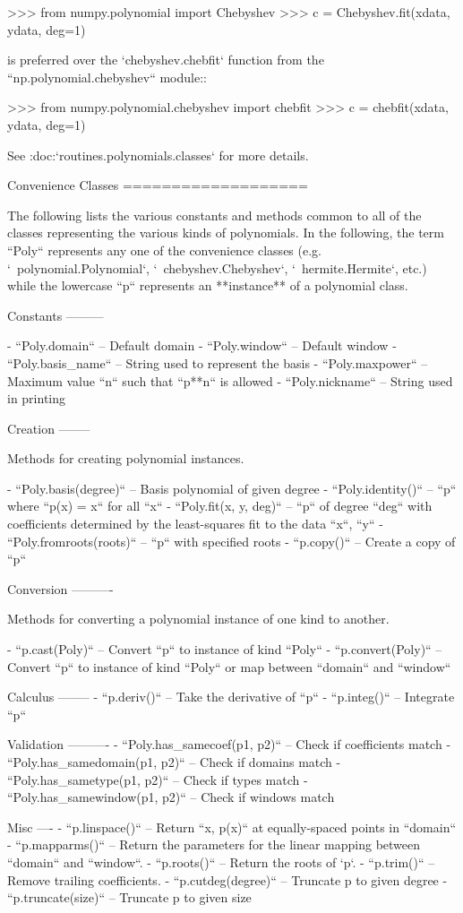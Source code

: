 \begin{DoxyVerb}
    >>> from numpy.polynomial import Chebyshev
    >>> c = Chebyshev.fit(xdata, ydata, deg=1)

is preferred over the `chebyshev.chebfit` function from the
``np.polynomial.chebyshev`` module::

    >>> from numpy.polynomial.chebyshev import chebfit
    >>> c = chebfit(xdata, ydata, deg=1)

See :doc:`routines.polynomials.classes` for more details.

Convenience Classes
===================

The following lists the various constants and methods common to all of
the classes representing the various kinds of polynomials. In the following,
the term ``Poly`` represents any one of the convenience classes (e.g.
`~polynomial.Polynomial`, `~chebyshev.Chebyshev`, `~hermite.Hermite`, etc.)
while the lowercase ``p`` represents an **instance** of a polynomial class.

Constants
---------

- ``Poly.domain``     -- Default domain
- ``Poly.window``     -- Default window
- ``Poly.basis_name`` -- String used to represent the basis
- ``Poly.maxpower``   -- Maximum value ``n`` such that ``p**n`` is allowed
- ``Poly.nickname``   -- String used in printing

Creation
--------

Methods for creating polynomial instances.

- ``Poly.basis(degree)``    -- Basis polynomial of given degree
- ``Poly.identity()``       -- ``p`` where ``p(x) = x`` for all ``x``
- ``Poly.fit(x, y, deg)``   -- ``p`` of degree ``deg`` with coefficients
  determined by the least-squares fit to the data ``x``, ``y``
- ``Poly.fromroots(roots)`` -- ``p`` with specified roots
- ``p.copy()``              -- Create a copy of ``p``

Conversion
----------

Methods for converting a polynomial instance of one kind to another.

- ``p.cast(Poly)``    -- Convert ``p`` to instance of kind ``Poly``
- ``p.convert(Poly)`` -- Convert ``p`` to instance of kind ``Poly`` or map
  between ``domain`` and ``window``

Calculus
--------
- ``p.deriv()`` -- Take the derivative of ``p``
- ``p.integ()`` -- Integrate ``p``

Validation
----------
- ``Poly.has_samecoef(p1, p2)``   -- Check if coefficients match
- ``Poly.has_samedomain(p1, p2)`` -- Check if domains match
- ``Poly.has_sametype(p1, p2)``   -- Check if types match
- ``Poly.has_samewindow(p1, p2)`` -- Check if windows match

Misc
----
- ``p.linspace()`` -- Return ``x, p(x)`` at equally-spaced points in ``domain``
- ``p.mapparms()`` -- Return the parameters for the linear mapping between
  ``domain`` and ``window``.
- ``p.roots()``    -- Return the roots of `p`.
- ``p.trim()``     -- Remove trailing coefficients.
- ``p.cutdeg(degree)`` -- Truncate p to given degree
- ``p.truncate(size)`` -- Truncate p to given size\end{DoxyVerb}
 

